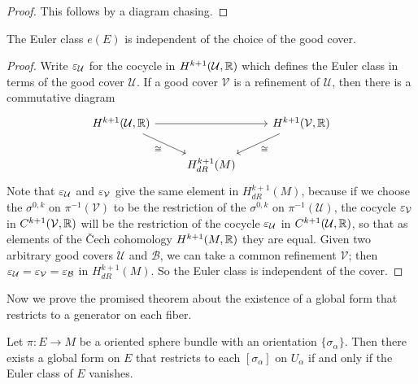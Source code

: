 \begin{proof}
This follows by a diagram chasing.
\end{proof}
\begin{proposition}
The Euler class $e(E)$ is independent of the choice of the good cover.
\end{proposition}
\begin{proof}
Write $\varepsilon_\mathcal{U}$ for the cocycle in $H^{k+1}(\mathcal{U},\mathbb{R})$ which defines the Euler class in terms of the good cover $\mathcal{U}$. If a good cover $\mathcal{V}$ 
is a refinement of $\mathcal{U}$, then there is a commutative diagram
\[\begin{tikzcd}
H^{k+1}(\mathcal{U},\R)\ar[rd,swap,"\cong"]\ar[rr]&&H^{k+1}(\mathcal{V},\R)\ar[ld,"\cong"]\\
&H^{k+1}_{dR}(M)&
\end{tikzcd}\]
Note that $\varepsilon_{\mathcal{U}}$ and $\varepsilon_{\mathcal{V}}$ give the same element in $H^{k+1}_{dR}(M)$, because if we choose the $\sigma^{0,k}$ on $\pi^{-1}(\mathcal{V})$ 
to be the restriction of the $\sigma^{0,k}$ on $\pi^{-1}(\mathcal{U})$, the cocycle $\varepsilon_{\mathcal{V}}$ in $C^{k+1}(\mathcal{V},\mathbb{R})$ will be the restriction of the 
cocycle $\varepsilon_{\mathcal{U}}$ in $C^{k+1}(\mathcal{U},\mathbb{R})$, so that as elements of the \v{C}ech cohomology $H^{k+1}(M,\mathbb{R})$ they are equal. Given two arbitrary good 
covers $\mathcal{U}$ and $\mathcal{B}$, we can take a common refinement $\mathcal{V}$; then $\varepsilon_{\mathcal{U}}=\varepsilon_{\mathcal{V}}=\varepsilon_{\mathcal{B}}$ in $H^{k+1}_{dR}(M)$. 
So the Euler class is independent of the cover.
\end{proof}
Now we prove the promised theorem about the existence of a global form that restricts to a generator on each fiber.
\begin{proposition}\label{sphere bundle global generator iff Euler class vanish}
Let $\pi:E\to M$ be a oriented sphere bundle with an orientation $\{\sigma_\alpha\}$. Then there exists a global form on $E$ that restricts to each $[\sigma_\alpha]$ 
on $U_\alpha$ if and only if the Euler class of $E$ vanishes.
\end{proposition}
